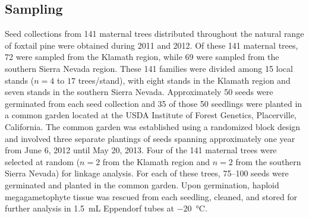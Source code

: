 \documentclass[11pt]{article}
\begin{document}
\subsection*{Sampling}
Seed collections from 141 maternal trees distributed throughout the natural range 
of foxtail pine were obtained during 2011 and 2012. Of these 141 maternal trees, 72 were sampled from the 
Klamath region, while 69 were sampled from the southern Sierra Nevada region. These 141 families were
divided among 15 local stands ($n = 4$ to $17$ trees/stand), with eight stands in the Klamath region and seven stands in the southern Sierra Nevada.
Approximately 50 seeds were germinated from each seed collection and 35 of those 50 seedlings were planted in a 
common garden located at the USDA Institute of Forest Genetics, Placerville, California. The 
common garden was established using a randomized block design and involved three separate plantings of seeds spanning
approximately one year from June 6, 2012 until May 20, 2013. Four of the 141 maternal trees were selected 
at random ($n = 2$ from the Klamath region and $n = 2$ from the southern Sierra Nevada) for linkage analysis. 
For each of these trees, \SIrange{75}{100}{} seeds were germinated and planted in the common garden. 
Upon germination, haploid megagametophyte tissue was rescued from each seedling, cleaned, and stored for further 
analysis in \SI{1.5}{\mL} Eppendorf tubes at \SI{-20}{\celsius}.
\end{document}
